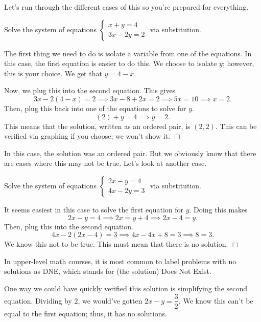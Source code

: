 \documentclass[../book.tex]{subfiles}
\begin{document}
Let's run through the different cases of this so you're prepared for everything.
\begin{example}
Solve the system of equations $\begin{cases} x+y=4 \\ 3x-2y=2 \end{cases}$ via substitution.
\end{example}
\begin{solution}
\noindent The first thing we need to do is isolate a variable from one of the equations.  In this case, the first equation is easier to do this.  We choose to isolate $y$; however, this is your choice.  We get that $y=4-x$.

Now, we plug this into the second equation.  This gives $$3x-2(4-x)=2 \implies 3x-8+2x=2 \implies 5x=10 \implies x=2.$$  Then, plug this back into one of the equations to solve for $y$.  
$$(2)+y=4 \implies y=2.$$  This means that the solution, written as an ordered pair, is $(2,2)$.  This can be verified via graphing if you choose; we won't show it.  $\Box$
\end{solution}
In this case, the solution was an ordered pair.  But we obviously know that there are cases where this may not be true.  Let's look at another case.
\begin{example}
Solve the system of equations $\begin{cases} 2x-y=4 \\ 4x-2y=3 \end{cases}$ via substitution.
\end{example}
\begin{solution}
It seems easiest in this case to solve the first equation for $y$.  Doing this makes $$2x-y=4 \implies 2x=y+4 \implies 2x-4=y.$$  Then, plug this into the second equation.  $$4x-2(2x-4)=3 \implies 4x-4x+8=3 \implies 8=3.$$  We know this not to be true.  This must mean that there is no solution.  $\Box$
\end{solution}

\begin{remark}
  In upper-level math courses, it is most common to label problems with no solutions as DNE, which stands for (the solution) Does Not Exist.
\end{remark}

One way we could have quickly verified this solution is simplifying the second equation.  Dividing by $2$, we would've gotten $2x-y=\dfrac{3}{2}$.  We know this can't be equal to the first equation; thus, it has no solutions.
\end{document}
